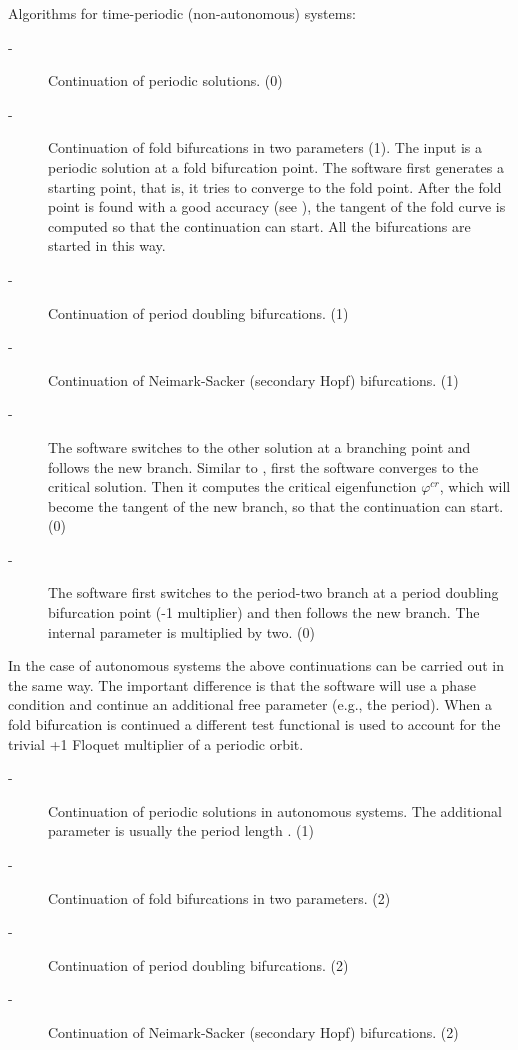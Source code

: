 \documentclass[10pt,a4paper]{ddedoc}
\begin{document}
\begin{description}
Algorithms for time-periodic (non-autonomous) systems:
\begin{description}
\item[ -] Continuation of periodic solutions. (0)
%
\item[ -] Continuation of fold bifurcations in two parameters (1). The
input is a periodic solution at a fold bifurcation point. The software first
generates a starting point, that is, it tries to converge to the fold point. After the fold point is found with a good accuracy (see
), the tangent of the fold curve is computed so that the continuation
can start. All the bifurcations are started in this way.
%
\item[ -] Continuation of period doubling bifurcations. (1)
%
\item[ -] Continuation of Neimark-Sacker (secondary Hopf) bifurcations.
(1)
%
\item[ -] The software switches to the other solution at a branching point and
follows the new branch. Similar to , first the software converges to
the critical solution. Then it computes the critical eigenfunction
$\varphi^{cr}$, which will become the tangent of the new branch, so that the
continuation can start. (0)
%
\item[ -] The software first switches to the period-two branch at a
period doubling bifurcation point
(-1 multiplier) and then follows the new branch. The internal parameter  is multiplied by two. (0)
\end{description}
In the case of autonomous systems the above continuations can be carried out in
the same way. The important difference is that the software will use a phase
condition and continue an additional free parameter (e.g., the period). When a
fold bifurcation is continued a different test functional is used to account for
the trivial +1 Floquet multiplier of a periodic orbit.
\begin{description}
\item[ -] Continuation of periodic solutions in autonomous systems. The
additional parameter is usually the period length . (1)
%
\item[ -] Continuation of fold bifurcations in two parameters. (2)
%
\item[ -] Continuation of period doubling bifurcations. (2)
%
\item[ -] Continuation of Neimark-Sacker (secondary Hopf) bifurcations.
(2)

\end{description}
\end{description}
\end{document}
